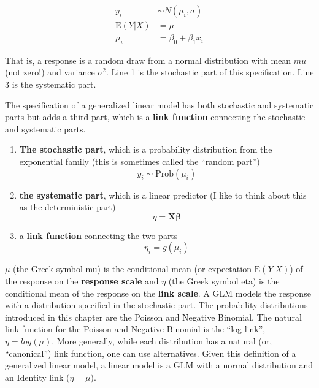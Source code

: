 \documentclass[]{book}
\providecommand{\tightlist}{%
  \setlength{\itemsep}{0pt}\setlength{\parskip}{0pt}}
\begin{document}
\begin{align}
y_i &\sim N(\mu_i, \sigma)\\
\mathrm{E}(Y|X) &= \mu\\
\mu_i &= \beta_0 + \beta_1 x_i
\label{eq:lm-spec2}
\end{align}

That is, a response is a random draw from a normal distribution with mean \(mu\) (not zero!) and variance \(\sigma^2\). Line 1 is the stochastic part of this specification. Line 3 is the systematic part.

The specification of a generalized linear model has both stochastic and systematic parts but adds a third part, which is a \textbf{link function} connecting the stochastic and systematic parts.

\begin{enumerate}
\def\labelenumi{\arabic{enumi}.}
\tightlist
\item
  \textbf{The stochastic part}, which is a probability distribution from the exponential family (this is sometimes called the ``random part'')
  \begin{equation}
  y_i \sim \mathrm{Prob}(\mu_i)
  \end{equation}
\item
  \textbf{the systematic part}, which is a linear predictor (I like to think about this as the deterministic part)
  \begin{equation}
  \eta=\mathbf{X}\boldsymbol{\beta}
  \end{equation}
\item
  a \textbf{link function} connecting the two parts
  \begin{equation}
  \eta_i = g(\mu_i)
  \end{equation}
\end{enumerate}

\(\mu\) (the Greek symbol mu) is the conditional mean (or expectation \(\mathrm{E}(Y|X)\)) of the response on the \textbf{response scale} and \(\eta\) (the Greek symbol eta) is the conditional mean of the response on the \textbf{link scale}. A GLM models the response with a distribution specified in the stochastic part. The probability distributions introduced in this chapter are the Poisson and Negative Binomial. The natural link function for the Poisson and Negative Binomial is the ``log link'', \(\eta = log(\mu)\). More generally, while each distribution has a natural (or, ``canonical'') link function, one can use alternatives. Given this definition of a generalized linear model, a linear model is a GLM with a normal distribution and an Identity link (\(\eta = \mu\)).
\end{document}
